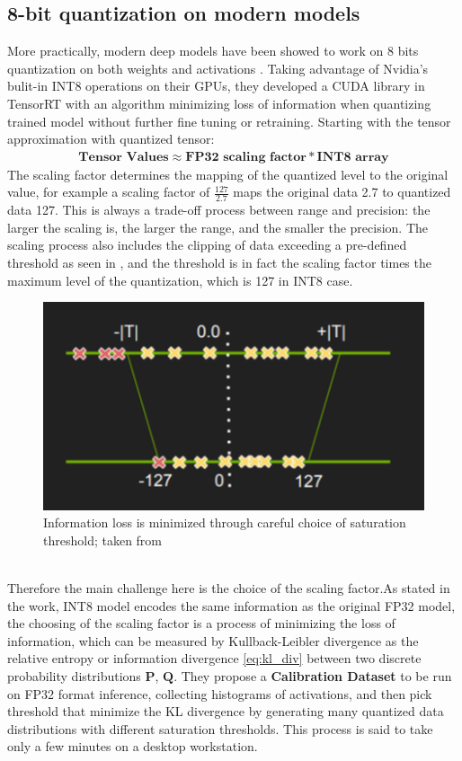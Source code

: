 \subsection{8-bit quantization on modern models}
More practically, modern deep models have been showed to work on 8 bits quantization on both weights and activations \cite{TensorRT8bit}. Taking advantage of Nvidia's bulit-in INT8 operations on their GPUs, they developed a CUDA library in TensorRT with an algorithm minimizing loss of information when quantizing trained model without further fine tuning or retraining. Starting with the tensor approximation with quantized tensor:
\begin{equation}
    \begin{aligned}\label{eq:tensorrtop}
    \textbf{Tensor Values}\approx\textbf{FP32 scaling factor}*\textbf{INT8 array}
    \end{aligned}
\end{equation}
 The scaling factor determines the mapping of the quantized level to the original value, for example a scaling factor of $\frac{127}{2.7}$ maps the original data 2.7 to  quantized data 127. This is always a trade-off process between range and precision: the larger the scaling is, the larger the range, and the smaller the precision. The scaling process also includes the clipping of data exceeding a pre-defined threshold as seen in , and the threshold is in fact the scaling factor times the maximum level of the quantization, which is 127 in INT8 case.
\begin{figure}
    \centering
    \includegraphics[width=0.5\linewidth]{inc/2_related_work/figure/tensorrt_thresold.png}
    \caption{Information loss is minimized through careful choice of saturation threshold; taken from \cite{TensorRT8bit}}
    \label{fig:tensorrt_thresold}
\end{figure}
\\
Therefore the main challenge here is the choice of the scaling factor.As stated in the work, INT8 model encodes the same information as the original FP32 model, the choosing of the scaling factor is a process of minimizing the loss of information, which can be measured by Kullback-Leibler divergence as the relative entropy or information divergence \eqref{eq:kl_div} between two discrete probability distributions $\boldsymbol{P}$, $\boldsymbol{Q}$. They propose a \textbf{Calibration Dataset} to be run on FP32 format inference, collecting histograms of activations, and then pick threshold that minimize the KL divergence by generating many quantized data distributions with different saturation thresholds. This process is said to take only a few minutes on a desktop workstation. \\ 
